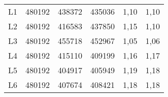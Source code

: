 \begin{center}
\begin{longtable}{cccccc}
    L1    & 480192 & 438372 & 435036 & 1,10  & 1,10 \\
    L2    & 480192 & 416583 & 437850 & 1,15  & 1,10 \\
    L3    & 480192 & 455718 & 452967 & 1,05  & 1,06 \\
    L4    & 480192 & 415110 & 409199 & 1,16  & 1,17 \\
    L5    & 480192 & 404917 & 405949 & 1,19  & 1,18 \\
    L6    & 480192 & 407674 & 408421 & 1,18  & 1,18 \\
\end{longtable}
\end{center}

%  
% 
% 


